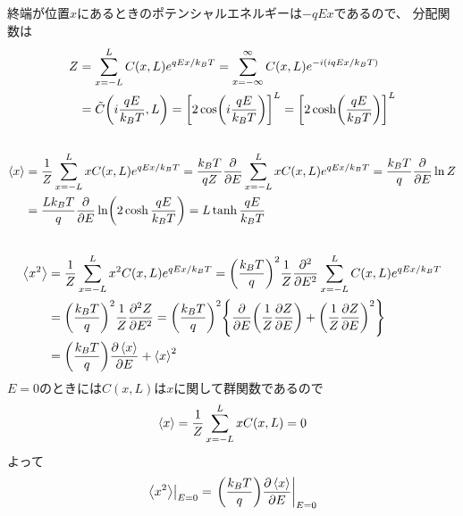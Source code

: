 \documentclass[../../sp_2014.tex]{subfiles}
\begin{document}
\subsection{}
終端が位置\(x\)にあるときのポテンシャルエネルギーは\(-qEx\)であるので、
分配関数は
\begin{equation}\begin{aligned}[b]
    Z &= \sum_{x=-L}^L C(x,L)e^{qEx/k_BT}
    = \sum_{x=-\infty}^\infty C(x,L)e^{-i(iqEx/k_BT)}\\
    &= \tilde{C}\qty(i\frac{qE}{k_BT}, L)
    = \qty[2\cos(i\frac{qE}{k_BT})]^L
    = \qty[2\cosh(\frac{qE}{k_BT})]^L
\end{aligned}\end{equation}

\subsection{}
\begin{equation}\begin{aligned}[b]
    \ev{x}
    &= \frac{1}{Z}\sum_{x=-L}^{L}xC(x,L)e^{qEx/k_BT}
    =\frac{k_BT}{qZ}\pdv{E}\sum_{x=-L}^{L}xC(x,L)e^{qEx/k_BT}
    =\frac{k_BT}{q}\pdv{E} \ln Z\\
    &= \frac{Lk_BT}{q}\pdv{E}\ln(2\cosh\frac{qE}{k_BT})
    = L\tanh\frac{qE}{k_BT}
\end{aligned}\end{equation}

\subsection{}

\begin{equation}\begin{aligned}[b]
    \ev{x^2}
    &=\frac{1}{Z}\sum_{x=-L}^{L}x^2C(x,L)e^{qEx/k_BT}
    =\qty(\frac{k_BT}{q})^2\frac{1}{Z}\pdv[2]{E}\sum_{x=-L}^{L}C(x,L)e^{qEx/k_BT}\\
    &=\qty(\frac{k_BT}{q})^2\frac{1}{Z}\pdv[2]{Z}{E}
    = \qty(\frac{k_BT}{q})^2\qty{\pdv{E}\qty(\frac{1}{Z}\pdv{Z}{E})+\qty(\frac{1}{Z}\pdv{Z}{E})^2}\\
    &= \qty(\frac{k_BT}{q})\pdv{\ev{x}}{E}+\ev{x}^2
\end{aligned}\end{equation}
\(E=0\)のときには\(C(x,L)\)は\(x\)に関して群関数であるので
\begin{equation}\begin{aligned}[b]
    \ev{x}=\frac{1}{Z}\sum_{x=-L}^{L}xC(x,L) =0
\end{aligned}\end{equation}
よって
\begin{equation}\begin{aligned}[b]
    \left.\ev{x^2}\right|_{E=0}=\left.\qty(\frac{k_BT}{q})\pdv{\ev{x}}{E}\right|_{E=0}
\end{aligned}\end{equation}
\end{document}
